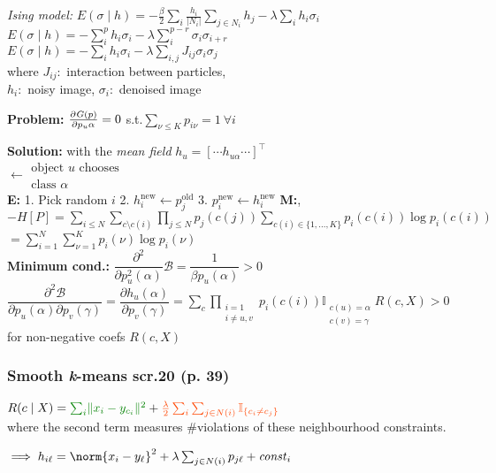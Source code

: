 \emph{Ising model:}\enskip
$E(\sigma\mid h) = -\frac{\beta}{2} \sum_i \frac{h_i}{|N_i|} \sum_{j \in N_i} h_j - \lambda \sum_i h_i \sigma_i$\\
$E(\sigma\mid h) = - \sum_i^p h_i \sigma_i  -\lambda\sum_i^{p-r}\sigma_i\sigma_{i+r} $\\
$E(\sigma\mid h) =  - \sum_i h_i \sigma_i - \lambda\sum_{i,j} J_{ij} \sigma_i \sigma_j$
\\
where $J_{ij}$:\, interaction between particles,\\\phantom{where}
$h_i$:\, noisy image,\enskip
$\sigma_i$:\, denoised image

\textbf{Problem:} \quad $\pderiv{G(p)}{p_u\alpha} = 0$ \enspace s.t.\enspace $\sum_{\nu\leq K} p_{i\nu} = 1 \: \forall i$

\textbf{Solution:}\quad
with the \textit{mean field} $h_u = [\cdots h_{u\alpha} \cdots]^\top$
\\
 $\leftarrow \substack{\text{object }u\text{ chooses}\\\text{class } \alpha}$
\\


\textbf{E:} 1. Pick random $i$ 2. $h_i^{\text{new}} \leftarrow p_j^{\text{old}}$ 3. $p_i^{\text{new}} \leftarrow h_i^{\text{new}}$
\textbf{M:},\\

$-H[P]=\underset{i\leq N}{\sum}\underset{c\setminus c(i)}{\sum}\underset{j\leq N}{\prod} p_j(c(j))\underset{{c(i)\in \{1,...,K\}}}{\sum}p_i(c(i))\log p_i(c(i))$\newline
$=\sum_{i=1}^{N}\sum_{\nu=1}^{K}p_i(\nu) \log p_i(\nu)$\\
\textbf{Minimum cond.:} $\dfrac{\partial^2}{\partial p_u^2(\alpha)} \mathcal{B}=\dfrac{1}{\beta p_u(\alpha)}>0$\\
$\dfrac{\partial^2\mathcal{B}}{\partial p_u(\alpha)\partial p_v(\gamma)}=\dfrac{\partial h_u(\alpha)}{\partial p_v(\gamma)}=\sum_c\prod_{\substack{i = 1 \\ i\neq u, v}}p_i(c(i))\mathbb{I}_{\substack{c(u)=\alpha \\ c(v)=\gamma}}R(c, X)>0$ for non-negative coefs $R(c, X)$


\subsubsection{Smooth \textit{\rmfamily k}-means
\qquad\normalfont\sffamily\color{gray}scr.20 (p. 39)}

$R(c\mid X) =
{\color{Green} \sum_i \lVert x_i - y_{c_i} \rVert^2}
+
{\color{OrangeRed} \frac\lambda2 \sum_i \sum_{j\in N(i)} \mathbb I_{\{c_i \neq c_j\}}}$
\\
where the second term measures {\color{OrangeRed} \#violations} of these neighbourhood constraints.

$\implies h_{i\ell} = \norm{x_i - y_\ell}^2 + \lambda \sum_{j\in N(i)} p_{j\ell} + \mathit{const}_i$

